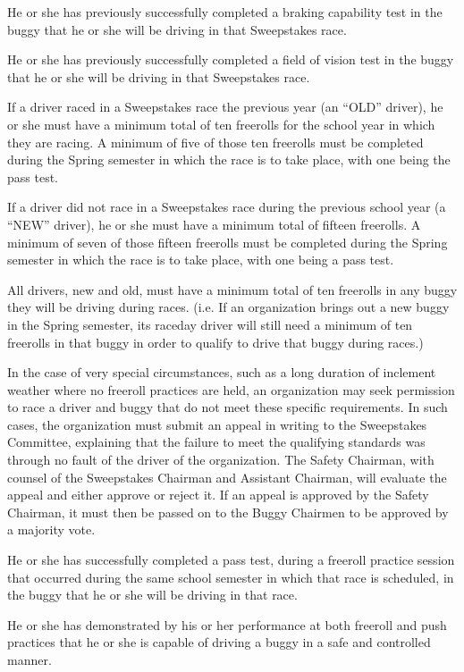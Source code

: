 	He or she has previously successfully completed a braking capability test in
	the buggy that he or she will be driving in that Sweepstakes race.

	He or she has previously successfully completed a field of vision test in the
	buggy that he or she will be driving in that Sweepstakes race.

	If a driver raced in a Sweepstakes race the previous year (an ``OLD'' driver),
	he or she must have a minimum total of ten freerolls for the school year in
	which they are racing. A minimum of five of those ten freerolls must be
	completed during the Spring semester in which the race is to take place, with
	one being the pass test.

	If a driver did not race in a Sweepstakes race during the previous school year
	(a ``NEW'' driver), he or she must have a minimum total of fifteen freerolls. A
	minimum of seven of those fifteen freerolls must be completed during the Spring
	semester in which the race is to take place, with one being a pass test.

	All drivers, new and old, must have a minimum total of ten freerolls in any
	buggy they will be driving during races. (i.e. If an organization brings out a
	new buggy in the Spring semester, its raceday driver will still need a minimum
	of ten freerolls in that buggy in order to qualify to drive that buggy during
	races.)

	In the case of very special circumstances, such as a long duration of inclement
	weather where no freeroll practices are held, an organization may seek
	permission to race a driver and buggy that do not meet these specific
	requirements. In such cases, the organization must submit an appeal in writing
	to the Sweepstakes Committee, explaining that the failure to meet the
	qualifying standards was through no fault of the driver of the organization.
	The Safety Chairman, with counsel of the Sweepstakes Chairman and Assistant
	Chairman, will evaluate the appeal and either approve or reject it. If an
	appeal is approved by the Safety Chairman, it must then be passed on to the
	Buggy Chairmen to be approved by a majority vote.

	He or she has successfully completed a pass test, during a freeroll practice
	session that occurred during the same school semester in which that race is
	scheduled, in the buggy that he or she will be driving in that race.

	He or she has demonstrated by his or her performance at both freeroll and push
	practices that he or she is capable of driving a buggy in a safe and controlled
	manner.

